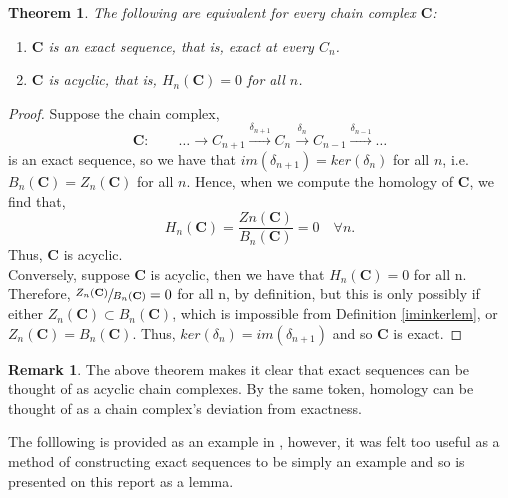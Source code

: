 \documentclass[11.5pt, twoside, a4paper, titlepage]{report}
\theoremstyle{definition}
\newtheorem{rem}[mydef]{Remark}
\theoremstyle{plain}
\newtheorem{thm}[mydef]{Theorem}
\begin{document}
\begin{thm}
The following are equivalent for every chain complex $\mathbf{C}$:
\begin{enumerate}
\item $\mathbf{C}$ is an exact sequence, that is, exact at every $C_n$.
\item $\mathbf{C}$ is acyclic, that is, $H_n(\mathbf{C})=0$ for all $n$.
\end{enumerate}
\end{thm}
\begin{proof}
Suppose the chain complex, 
\begin{equation*}
\mathbf{C}:\qquad \dots \xrightarrow{} C_{n+1} \xrightarrow{\delta_{n+1}} C_n \xrightarrow{\delta_n} C_{n-1} \xrightarrow{\delta_{n-1}} \dots
\end{equation*}
is an exact sequence, so we have that $im(\delta_{n+1})=ker(\delta_n)$ for all $n$, i.e. $B_n(\mathbf{C})=Z_n(\mathbf{C})$ for all $n$. Hence, when we compute the homology of $\mathbf{C}$, we find that,
\begin{equation*}
H_n(\mathbf{C})=\frac{Zn(\mathbf{C})}{B_n(\mathbf{C})}=0 \quad \forall n.
\end{equation*}
Thus, $\mathbf{C}$ is acyclic.\\
Conversely, suppose $\mathbf{C}$ is acyclic, then we have that $H_n(\mathbf{C})=0$ for all n. Therefore, $\sfrac{Z_n(\mathbf{C})}{B_n(\mathbf{C})}=0$ for all n, by definition, but this is only possibly if either $Z_n(\mathbf{C})\subset B_n(\mathbf{C})$, which is impossible from Definition \ref{iminkerlem}, or $Z_n(\mathbf{C})=B_n(\mathbf{C})$. Thus, $ker(\delta_n)=im(\delta_{n+1})$ and so $\mathbf{C}$ is exact.
\end{proof}

\begin{rem}
The above theorem makes it clear that exact sequences can be thought of as acyclic chain complexes. By the same token, homology can be thought of as a chain complex's deviation from exactness.
\end{rem}

The folllowing is provided as an example in \cite{Schiff}, however, it was felt too useful as a method of constructing exact sequences to be simply an example and so is presented on this report as a lemma.
\end{document}
